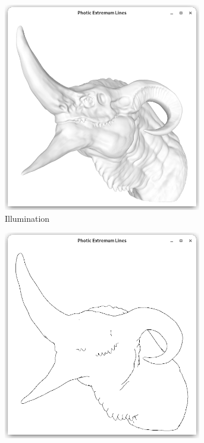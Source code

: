 \documentclass[9pt,fleqn,twoside,twocolumn]{stdglobal}
\begin{document}
  \begin{figure}[h]
      \centering
      \begin{subfigure}[b]{0.24\textwidth}
        \centering
        \includegraphics[width=0.95\textwidth,trim={15px 15 15 50},clip]{images/dragon-head-viewer-shader.png}
        \caption{Illumination}
      \end{subfigure}%
      \hfill%
      \begin{subfigure}[b]{0.24\textwidth}
        \centering
        \includegraphics[width=0.95\textwidth,trim={15px 15 15 50},clip]{images/dragon-head-contours.png}

\end{subfigure}
\end{figure}
\end{document}

